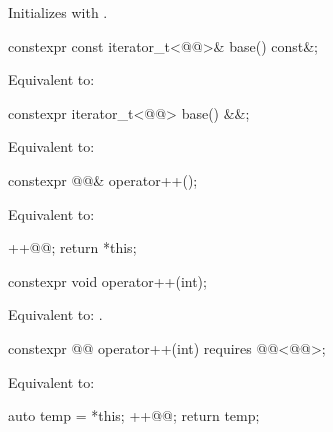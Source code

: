 \begin{itemdescr}
\pnum
\effects
Initializes  with .
\end{itemdescr}

%
\begin{itemdecl}
constexpr const iterator_t<@@>& base() const&;
\end{itemdecl}

\begin{itemdescr}
\pnum
\effects
Equivalent to: 
\end{itemdescr}

%
\begin{itemdecl}
constexpr iterator_t<@@> base() &&;
\end{itemdecl}

\begin{itemdescr}
\pnum
\effects
Equivalent to: 
\end{itemdescr}

%
\begin{itemdecl}
constexpr @@& operator++();
\end{itemdecl}

\begin{itemdescr}
\pnum
\effects
Equivalent to:
\begin{codeblock}
++@@;
return *this;
\end{codeblock}
\end{itemdescr}

%
\begin{itemdecl}
constexpr void operator++(int);
\end{itemdecl}

\begin{itemdescr}
\pnum
\effects
Equivalent to: .
\end{itemdescr}

%
\begin{itemdecl}
constexpr @@ operator++(int) requires @@<@@>;
\end{itemdecl}

\begin{itemdescr}
\pnum
\effects
Equivalent to:
\begin{codeblock}
auto temp = *this;
++@@;
return temp;
\end{codeblock}
\end{itemdescr}

